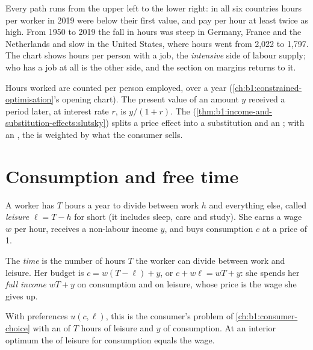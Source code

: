 Every path runs from the upper left to the lower right: in all six
countries hours per worker in 2019 were below their first value, and pay
per hour at least twice as high. %
From 1950 to 2019 the fall in hours was steep in Germany, France and the
Netherlands and slow in the United States, where hours went from 2,022 to
1,797. %
The chart shows hours per person with a job, the \emph{intensive}
side of labour supply; who has a job at all is the other side, and the
section on margins returns to it.

\begin{recall}
Hours worked are counted per person employed, over a year
(\cref{ch:b1:constrained-optimisation}'s opening chart). The present value
of an amount $y$ received a period later, at interest rate $r$, is
$y/(1 + r)$. The 
(\cref{thm:b1:income-and-substitution-effects:slutsky}) splits a price
effect into a substitution and an ; with an , the
 is weighted by what the consumer sells.
\end{recall}

\section{Consumption and free time}\label{sec:b1:labour-supply-and-saving:leisure}

A worker has $T$ hours a year to divide between work $h$ and everything
else, called \emph{leisure} $\ell = T - h$ for short (it includes sleep,
care and study). She earns a wage $w$ per hour, receives a non-labour
income $y$, and buys consumption $c$ at a price of 1.

\begin{definition}\label{def:b1:labour-supply-and-saving:full-income}
The \emph{time } is the number of hours $T$ the worker can divide
between work and leisure. Her budget is $c = w(T - \ell) + y$, or
$c + w\ell = wT + y$: she spends her \emph{full income} $wT + y$ on
consumption and on leisure, whose price is the wage she gives up.
\end{definition}

With preferences $u(c, \ell)$, this is the consumer's problem of
\cref{ch:b1:consumer-choice} with an  of $T$ hours of leisure and
$y$ of consumption. At an interior optimum the  of leisure for
consumption equals the wage.

